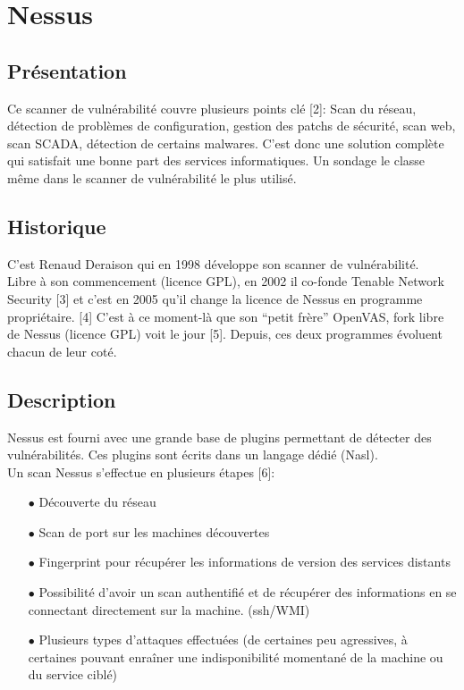 \section{Nessus}
\thispagestyle{plain}
\subsection{Présentation}
Ce scanner de vulnérabilité couvre plusieurs points clé [2]: Scan du réseau, détection de problèmes de configuration, gestion des patchs de sécurité, scan web, scan SCADA, détection de certains malwares. C’est donc une solution complète qui satisfait une bonne part des services informatiques. Un sondage le classe même dans le scanner de vulnérabilité le plus utilisé.

\subsection{Historique}
C’est Renaud Deraison qui en 1998 développe son scanner de vulnérabilité.\\
Libre à son commencement (licence GPL), en 2002 il co-fonde Tenable Network Security [3] et c’est en 2005 qu’il change la licence de Nessus en programme propriétaire. [4] C’est à ce moment-là que son ``petit frère'' OpenVAS, fork libre de Nessus (licence GPL) voit le jour [5]. Depuis, ces deux programmes évoluent chacun de leur coté.

\subsection{Description}
Nessus est fourni avec une grande base de plugins permettant de détecter des vulnérabilités. Ces plugins sont écrits dans un langage dédié (Nasl).\\
Un scan Nessus s’effectue en plusieurs étapes [6]:\\
\begin{itemize}
\item [$\bullet$]Découverte du réseau\\
\item [$\bullet$]Scan de port sur les machines découvertes\\
\item [$\bullet$]Fingerprint pour récupérer les informations de version des services distants\\
\item [$\bullet$]Possibilité d’avoir un scan authentifié et de récupérer des informations en se connectant directement sur la machine. (ssh/WMI)\\
\item [$\bullet$]Plusieurs types d’attaques effectuées (de certaines peu agressives, à certaines pouvant enraîner une indisponibilité momentané de la machine ou du service ciblé)\\
\end{itemize}

